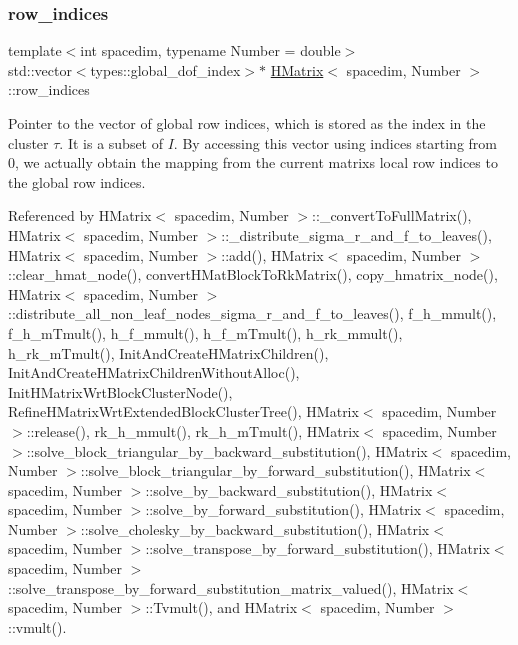 \mbox{\label{classHMatrix_a33b3a936f1b40e320e96d47471da07ae}} 
\subsubsection{\texorpdfstring{row\+\_\+indices}{row\_indices}}
{\footnotesize\ttfamily template$<$int spacedim, typename Number = double$>$ \\
std\+::vector$<$types\+::global\+\_\+dof\+\_\+index$>$$\ast$ \hyperlink{classHMatrix}{H\+Matrix}$<$ spacedim, Number $>$\+::row\+\_\+indices\hspace{0.3cm}{\ttfamily [private]}}

Pointer to the vector of global row indices, which is stored as the index in the cluster $\tau$. It is a subset of $I$. By accessing this vector using indices starting from 0, we actually obtain the mapping from the current matrix\textquotesingle{}s local row indices to the global row indices. 

Referenced by H\+Matrix$<$ spacedim, Number $>$\+::\+\_\+convert\+To\+Full\+Matrix(), H\+Matrix$<$ spacedim, Number $>$\+::\+\_\+distribute\+\_\+sigma\+\_\+r\+\_\+and\+\_\+f\+\_\+to\+\_\+leaves(), H\+Matrix$<$ spacedim, Number $>$\+::add(), H\+Matrix$<$ spacedim, Number $>$\+::clear\+\_\+hmat\+\_\+node(), convert\+H\+Mat\+Block\+To\+Rk\+Matrix(), copy\+\_\+hmatrix\+\_\+node(), H\+Matrix$<$ spacedim, Number $>$\+::distribute\+\_\+all\+\_\+non\+\_\+leaf\+\_\+nodes\+\_\+sigma\+\_\+r\+\_\+and\+\_\+f\+\_\+to\+\_\+leaves(), f\+\_\+h\+\_\+mmult(), f\+\_\+h\+\_\+m\+Tmult(), h\+\_\+f\+\_\+mmult(), h\+\_\+f\+\_\+m\+Tmult(), h\+\_\+rk\+\_\+mmult(), h\+\_\+rk\+\_\+m\+Tmult(), Init\+And\+Create\+H\+Matrix\+Children(), Init\+And\+Create\+H\+Matrix\+Children\+Without\+Alloc(), Init\+H\+Matrix\+Wrt\+Block\+Cluster\+Node(), Refine\+H\+Matrix\+Wrt\+Extended\+Block\+Cluster\+Tree(), H\+Matrix$<$ spacedim, Number $>$\+::release(), rk\+\_\+h\+\_\+mmult(), rk\+\_\+h\+\_\+m\+Tmult(), H\+Matrix$<$ spacedim, Number $>$\+::solve\+\_\+block\+\_\+triangular\+\_\+by\+\_\+backward\+\_\+substitution(), H\+Matrix$<$ spacedim, Number $>$\+::solve\+\_\+block\+\_\+triangular\+\_\+by\+\_\+forward\+\_\+substitution(), H\+Matrix$<$ spacedim, Number $>$\+::solve\+\_\+by\+\_\+backward\+\_\+substitution(), H\+Matrix$<$ spacedim, Number $>$\+::solve\+\_\+by\+\_\+forward\+\_\+substitution(), H\+Matrix$<$ spacedim, Number $>$\+::solve\+\_\+cholesky\+\_\+by\+\_\+backward\+\_\+substitution(), H\+Matrix$<$ spacedim, Number $>$\+::solve\+\_\+transpose\+\_\+by\+\_\+forward\+\_\+substitution(), H\+Matrix$<$ spacedim, Number $>$\+::solve\+\_\+transpose\+\_\+by\+\_\+forward\+\_\+substitution\+\_\+matrix\+\_\+valued(), H\+Matrix$<$ spacedim, Number $>$\+::\+Tvmult(), and H\+Matrix$<$ spacedim, Number $>$\+::vmult().

